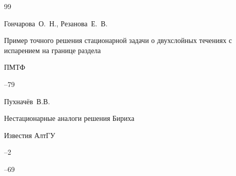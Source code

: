 \begin{thebibliography}{99}









\by Гончарова~О.~Н.,  Резанова~Е.~В.

\paper Пример точного решения стационарной задачи о двухслойных течениях с испарением на границе раздела

\jour ПМТФ



--79
















\by Пухначёв~В.В.

\paper Нестационарные аналоги решения Бириха

\jour Известия АлтГУ


--2

--69









\end{thebibliography}
